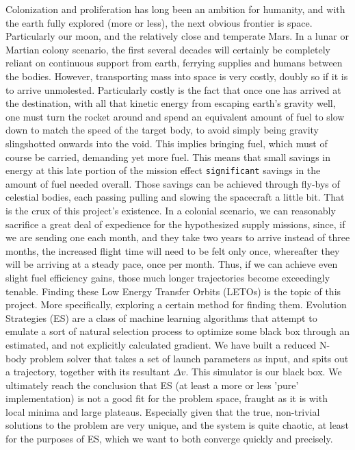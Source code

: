 Colonization and proliferation has long been an ambition for humanity, and with the earth fully explored (more or less), the next obvious frontier is space. Particularly our moon, and the relatively close and temperate Mars. In a lunar or Martian colony scenario, the first several decades will certainly be completely reliant on continuous support from earth, ferrying supplies and humans between the bodies. However, transporting mass into space is very costly, doubly so if it is to arrive unmolested. Particularly costly is the fact that once one has arrived at the destination, with all that kinetic energy from escaping earth's gravity well, one must turn the rocket around and spend an equivalent amount of fuel to slow down to match the speed of the target body, to avoid simply being gravity slingshotted onwards into the void. This implies bringing fuel, which must of course be carried, demanding yet more fuel. This means that small savings in energy at this late portion of the mission effect \texttt{significant} savings in the amount of fuel needed overall. Those savings can be achieved through fly-bys of celestial bodies, each passing pulling and slowing the spacecraft a little bit. That is the crux of this project's existence. In a colonial scenario, we can reasonably sacrifice a great deal of expedience for the hypothesized supply missions, since, if we are sending one each month, and they take two years to arrive instead of three months, the increased flight time will need to be felt only once, whereafter they will be arriving at a steady pace, once per month. Thus, if we can achieve even slight fuel efficiency gains, those much longer trajectories become exceedingly tenable. Finding these Low Energy Transfer Orbits (LETOs) is the topic of this project. More specifically, exploring a certain method for finding them. Evolution Strategies (ES) are a class of machine learning algorithms that attempt to emulate a sort of natural selection process to optimize some black box through an estimated, and not explicitly calculated gradient. We have built a reduced N-body problem solver that takes a set of launch parameters as input, and spits out a trajectory, together with its resultant $\Delta v$. This simulator is our black box. We ultimately reach the conclusion that ES (at least a more or less 'pure' implementation) is not a good fit for the problem space, fraught as it is with local minima and large plateaus. Especially given that the true, non-trivial solutions to the problem are very unique, and the system is quite chaotic, at least for the purposes of ES, which we want to both converge quickly and precisely.

